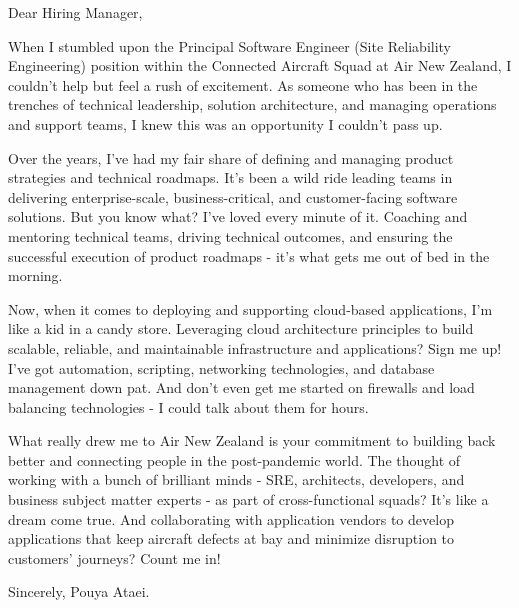 \documentclass[10pt,a4paper,ragged2e]{altacv}
\begin{document}


\vspace{1em} %

Dear Hiring Manager,

\vspace{1em}

When I stumbled upon the Principal Software Engineer (Site Reliability Engineering) position within the Connected Aircraft Squad at Air New Zealand, I couldn't help but feel a rush of excitement. As someone who has been in the trenches of technical leadership, solution architecture, and managing operations and support teams, I knew this was an opportunity I couldn't pass up.

\vspace{1em}

Over the years, I've had my fair share of defining and managing product strategies and technical roadmaps. It's been a wild ride leading teams in delivering enterprise-scale, business-critical, and customer-facing software solutions. But you know what? I've loved every minute of it. Coaching and mentoring technical teams, driving technical outcomes, and ensuring the successful execution of product roadmaps - it's what gets me out of bed in the morning.

\vspace{1em}

Now, when it comes to deploying and supporting cloud-based applications, I'm like a kid in a candy store. Leveraging cloud architecture principles to build scalable, reliable, and maintainable infrastructure and applications? Sign me up! I've got automation, scripting, networking technologies, and database management down pat. And don't even get me started on firewalls and load balancing technologies - I could talk about them for hours.

\vspace{1em}

What really drew me to Air New Zealand is your commitment to building back better and connecting people in the post-pandemic world. The thought of working with a bunch of brilliant minds - SRE, architects, developers, and business subject matter experts - as part of cross-functional squads? It's like a dream come true. And collaborating with application vendors to develop applications that keep aircraft defects at bay and minimize disruption to customers' journeys? Count me in!


\vspace{2em} %

Sincerely, \newline
Pouya Ataei.
\end{document}
